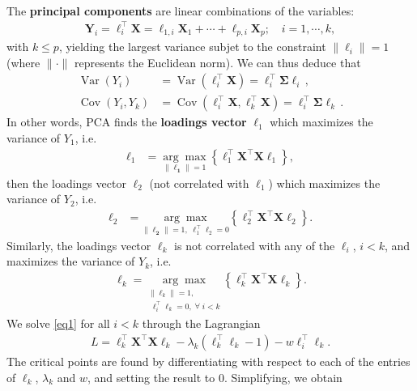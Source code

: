 \documentclass[20pt,landscape,footrule,headrule]{foils}
\begin{document}
{{\newpage\ \\ \noindent The \textbf{principal components} are linear combinations of the variables: 
\begin{align*}
\textbf{Y}_i=\ell^{\!\top}_i\textbf{X}=\ell_{1,i}\textbf{X}_1+\cdots+\ell_{p,i}\textbf{X}_p;\quad i=1,\cdots,k,
\end{align*}
with $k\leq p$, yielding the largest variance subjet to the constraint $\|\ell_i\|=1$ (where $\|\cdot\| $ represents the Euclidean norm). We can thus deduce that  
\begin{align*}
\operatorname{Var}\left(Y_{i}\right) &=\operatorname{Var}\left(\ell_{i}^{\!\top} \boldsymbol{X}\right)=\ell_{i}^{\!\top} \boldsymbol{\Sigma} \ell_{i} \,,\\ 
\operatorname{Cov}\left(Y_{i}, Y_{k}\right) &=\operatorname{Cov}\left(\ell_{i}^{\!\top} \boldsymbol{X}, \ell_{k}^{\!\top} \boldsymbol{X}\right)=\ell_{i}^{\!\top} \boldsymbol{\Sigma} \ell_{k}\, .
\end{align*}
In other words, PCA finds the \textbf{loadings vector} $\ell_{1}$ which maximizes the variance of $Y_1$, i.e. 
\begin{align*}
\mathbf{\ell}_{1}&=\underset{\|\mathbf{\ell_1}\|=1}{\arg \max }\left\{\ell^{\!\top}_1\mathbf{X}^{\!\top} \mathbf{X} \ell_1\right\},
\end{align*}
then the loadings vector $\ell_2$ (not correlated with $\ell_1$) which maximizes the variance of $Y_2$, i.e.   
\begin{align*}
\mathbf{\ell}_{2}& =\underset{\|\mathbf{\ell_2}\|=1,\; \ell_{1}^{\!\top}\ell_{2} =0}{\arg \max }\left\{\ell^{\!\top}_2\mathbf{X}^{\!\top} \mathbf{X} \ell_2\right\}.
\end{align*}
Similarly, the loadings vector $\ell_k$ is not correlated with any of the $\ell_i$, $i<k$, and maximizes the variance of $Y_k$, i.e.
\begin{align}
\mathbf{\ell}_k=\underset{\substack{\|\ell_k\|=1,\\ \;\ell_{i}^{\!\top}\ell_k=0,\;\forall\;i<k}}{\arg \max} \left\{\ell^{\!\top}_k\mathbf{X}^{\!\top} \mathbf{X} \ell_k\right\}.\label{eq1}
\end{align}
We solve \eqref{eq1} for all  $i<k$ through the Lagrangian
\begin{align*}
L=\ell^{\!\top}_k\mathbf{X}^{\!\top} \mathbf{X} \ell_k-\lambda_k(\ell^{\!\top}_k\ell_k-1)-w\ell_{i}^{\!\top}\ell_k.
\end{align*}
The critical points are found by differentiating with respect to each of the entries of $\ell_k$, $\lambda_k$ and $w$, and setting the result to 0. Simplifying, we obtain  
}}
\end{document}
